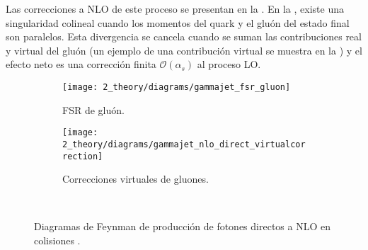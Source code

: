 Las correcciones a \ac{NLO} de este proceso se presentan en la \Fig{\ref{fig:theory:sm:prompt_photon:feynman_nlo_direct}}. En la \Fig{\ref{fig:theory:sm:prompt_photon:feynman_nlo_direct:gluon}}, existe una singularidad colineal cuando los momentos del quark y el gluón del estado final son paralelos. Esta divergencia se cancela cuando se suman las contribuciones real y virtual del gluón (un ejemplo de una contribución virtual se muestra en la \Fig{\ref{fig:theory:sm:prompt_photon:feynman_nlo_direct:gluon_virtual}}) y el efecto neto es una corrección finita \(\mathcal{O}(\alpha_s)\) al proceso \ac{LO}.

\begin{figure}[ht!]
    \centering
    \begin{subfigure}[h]{0.49\linewidth}
        \centering
        \texttt{[image: 2\_theory/diagrams/gammajet\_fsr\_gluon]}
        \caption{\Ac{FSR} de gluón.}
        \label{fig:theory:sm:prompt_photon:feynman_nlo_direct:gluon}
    \end{subfigure}
    \hfill
    \begin{subfigure}[h]{0.49\linewidth}
        \centering
        \texttt{[image: 2\_theory/diagrams/gammajet\_nlo\_direct\_virtualcorrection]}
        \caption{Correcciones virtuales de gluones.}
        \label{fig:theory:sm:prompt_photon:feynman_nlo_direct:gluon_virtual}
    \end{subfigure}\\
    \caption{Diagramas de Feynman de producción de fotones directos a \ac{NLO} en colisiones \pp.}
    \label{fig:theory:sm:prompt_photon:feynman_nlo_direct}
\end{figure}

